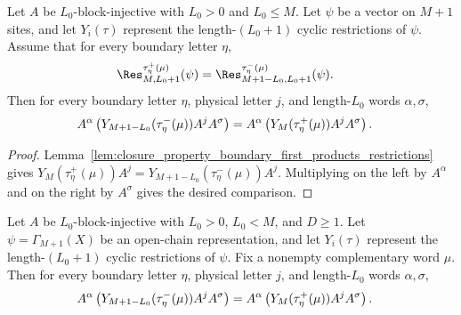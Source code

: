 \begin{lemma}
    \label{lem:closure_property_wrapped_mirror_left_word_products_boundary_restrictions}
    \leanok
    Let $A$ be $L_0$-block-injective with $L_0>0$ and $L_0\le M$. Let
    $\psi$ be a vector on $M+1$ sites, and let $Y_i(\tau)$ represent the
    length-$(L_0+1)$ cyclic restrictions of $\psi$. Assume that for every
    boundary letter $\eta$,
    \begin{align}
        \Res^{\tau^+_\eta(\mu)}_{M,L_0+1}(\psi)
         & =
        \Res^{\tau^-_\eta(\mu)}_{M+1-L_0,L_0+1}(\psi).
        \notag
    \end{align}
    Then for every boundary letter $\eta$, physical letter $j$, and
    length-$L_0$ words $\alpha,\sigma$,
    \begin{align}
        A^\alpha
        \left(Y_{M+1-L_0}(\tau^-_\eta(\mu))A^jA^\sigma\right)
         & =
        A^\alpha
        \left(Y_M(\tau^+_\eta(\mu))A^jA^\sigma\right).
        \notag
    \end{align}
\end{lemma}

\begin{proof}
    \leanok
    Lemma~\ref{lem:closure_property_boundary_first_products_restrictions} gives
    $Y_M(\tau^+_\eta(\mu))A^j = Y_{M+1-L_0}(\tau^-_\eta(\mu))A^j$.
    Multiplying on the left by $A^\alpha$ and on the right by $A^\sigma$
    gives the desired comparison.
\end{proof}

\begin{lemma}
    \label{thm:closure_property_wrapped_mirror_left_word_products_ground_space}
    \leanok
    Let $A$ be $L_0$-block-injective with $L_0>0$, $L_0<M$, and
    $D\ge1$. Let $\psi=\Gamma_{M+1}(X)$ be an open-chain representation, and
    let $Y_i(\tau)$ represent the length-$(L_0+1)$ cyclic restrictions of
    $\psi$. Fix a nonempty complementary word $\mu$. Then for every boundary
    letter $\eta$, physical letter $j$, and length-$L_0$ words
    $\alpha,\sigma$,
    \begin{align}
        A^\alpha
        \left(Y_{M+1-L_0}(\tau^-_\eta(\mu))A^jA^\sigma\right)
         & =
        A^\alpha
        \left(Y_M(\tau^+_\eta(\mu))A^jA^\sigma\right).
        \notag
    \end{align}
\end{lemma}

